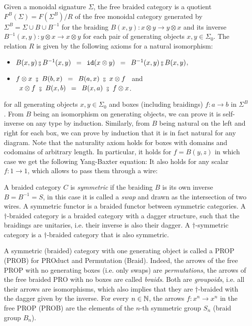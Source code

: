 Given a monoidal signature $\Sigma$, the free braided category is a quotient $F^B(\Sigma) = F(\Sigma^B) / R$ of the free monoidal category generated by $\Sigma^B =  \Sigma \cup B \cup B^{-1}$ for the braiding $B(x, y) : x \otimes y \to y \otimes x$ and its inverse $B^{-1}(x, y) : y \otimes x \to x \otimes y$ for each pair of generating objects $x, y \in \Sigma_0$.
The relation $R$ is given by the following axioms for a natural isomorphism:
\begin{itemize}
\item $B(x, y) \fcmp B^{-1}(x, y)
\s = \s \id(x \otimes y) \s = \s B^{-1}(x, y) \fcmp B(x, y)$,
\item $f \otimes x \ \fcmp \ B(b, x) \s = \s B(a, x) \ \fcmp \ x \otimes f \s$ and $\s x \otimes f \ \fcmp \ B(x, b) \s = \s B(x, a) \ \fcmp \ f \otimes x$.
\begin{center}
\hfill
{}
\end{center}
\end{itemize}
for all generating objects $x, y \in \Sigma_0$ and boxes (including braidings) $f : a \to b$ in $\Sigma^B$.
From $B$ being an isomorphism on generating objects, we can prove it is self-inverse on any type by induction.
Similarly, from $B$ being natural on the left and right for each box, we can prove by induction that it is in fact natural for any diagram.
Note that the naturality axiom holds for boxes with domains and codomains of arbitrary length.
In particular, it holds for $f = B(y, z)$ in which case we get the following Yang-Baxter equation:
It also holds for any scalar $f : 1 \to 1$, which allows to pass them through a wire:

A braided category $C$ is \emph{symmetric} if the braiding $B$ is its own inverse $B = B^{-1} = S$, in this case it is called a \emph{swap} and drawn as the intersection of two wires.
A symmetric functor is a braided functor between symmetric categories.
A $\dagger$-braided category is a braided category with a dagger structure, such that the braidings are unitaries, i.e. their inverse is also their dagger.
A $\dagger$-symmetric category is a $\dagger$-braided category that is also symmetric.

\begin{remark}
A symmetric (braided) category with one generating object is called a PROP (PROB) for PROduct and Permutation (Braid).
Indeed, the arrows of the free PROP with no generating boxes (i.e. only swaps) are \emph{permutations}, the arrows of the free braided PRO with no boxes are called \emph{braids}.
Both are \emph{groupoids}, i.e. all their arrows are isomorphisms, which also implies that they are $\dagger$-braided with the dagger given by the inverse.
For every $n \in \mathbb{N}$, the arrows $f : x^n \to x^n$ in the free PROP (PROB) are the elements of the $n$-th symmetric group $S_n$ (braid group $B_n$).
\end{remark}

